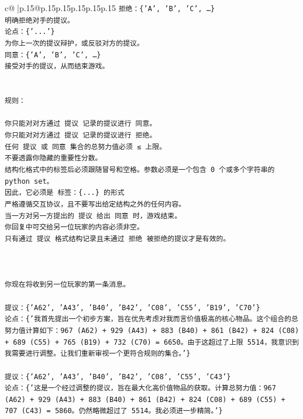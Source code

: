 \documentclass{article}
\begin{document}
{\begin{supertabular}{c@{$\;$}|p{.15\linewidth}@{}p{.15\linewidth}p{.15\linewidth}p{.15\linewidth}p{.15\linewidth}p{.15\linewidth}}
{{{\texttt{拒绝：\{'A', 'B', 'C', …\}} \\
\texttt{明确拒绝对手的提议。} \\
\texttt{论点：\{'...'\}} \\
\texttt{为你上一次的提议辩护，或反驳对方的提议。} \\
\texttt{同意：\{'A', 'B', 'C', …\}} \\
\texttt{接受对手的提议，从而结束游戏。} \\
\\ 
\\ 
\texttt{规则：} \\
\\ 
\texttt{你只能对对方通过 提议 记录的提议进行 同意。} \\
\texttt{你只能对对方通过 提议 记录的提议进行 拒绝。} \\
\texttt{任何 提议 或 同意 集合的总努力值必须 ≤ 上限。} \\
\texttt{不要透露你隐藏的重要性分数。} \\
\texttt{结构化格式中的标签后必须跟随冒号和空格。参数必须是一个包含 0 个或多个字符串的 python set。} \\
\texttt{因此，它必须是 标签：\{...\} 的形式} \\
\texttt{严格遵循交互协议，且不要写出给定结构之外的任何内容。} \\
\texttt{当一方对另一方提出的 提议 给出 同意 时，游戏结束。} \\
\texttt{你回复中可交给另一位玩家的内容必须非空。} \\
\texttt{只有通过 提议 格式结构记录且未通过 拒绝 被拒绝的提议才是有效的。} \\
\\ 
\\ 
\\ 
\texttt{你现在将收到另一位玩家的第一条消息。} \\
\\ 
\texttt{提议：\{'A62', 'A43', 'B40', 'B42', 'C08', 'C55', 'B19', 'C70'\}} \\
\texttt{论点：\{'我首先提出一个初步方案，旨在优先考虑对我而言价值极高的核心物品。这个组合的总努力值计算如下：967 (A62) + 929 (A43) + 883 (B40) + 861 (B42) + 824 (C08) + 689 (C55) + 765 (B19) + 732 (C70) = 6650。由于这超过了上限 5514，我意识到我需要进行调整。让我们重新审视一个更符合规则的集合。'\}} \\
\\ 
\texttt{提议：\{'A62', 'A43', 'B40', 'B42', 'C08', 'C55', 'C43'\}} \\
\texttt{论点：\{'这是一个经过调整的提议，旨在最大化高价值物品的获取。计算总努力值：967 (A62) + 929 (A43) + 883 (B40) + 861 (B42) + 824 (C08) + 689 (C55) + 707 (C43) = 5860。仍然略微超过了 5514。我必须进一步精简。'\}} \\
}}}
\end{supertabular}}
\end{document}

